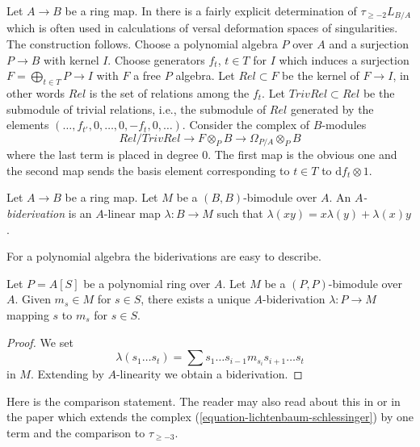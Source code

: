 \noindent
Let $A \to B$ be a ring map. In \cite{Lichtenbaum-Schlessinger}
there is a fairly explicit determination of $\tau_{\geq -2}L_{B/A}$
which is often used in calculations of versal deformation spaces of
singularities. The construction follows.
Choose a polynomial algebra $P$ over $A$
and a surjection $P \to B$ with kernel $I$. Choose generators
$f_t$, $t \in T$ for $I$ which induces a surjection
$F = \bigoplus_{t \in T} P \to I$ with $F$ a free $P$ algebra.
Let $Rel \subset F$ be the kernel of $F \to I$, in other words
$Rel$ is the set of relations among the $f_t$. Let $TrivRel \subset Rel$
be the submodule of trivial relations, i.e., the submodule of $Rel$
generated by the elements $(\ldots, f_{t'}, 0, \ldots, 0, -f_t, 0, \ldots)$.
Consider the complex of $B$-modules
\begin{equation}
\label{equation-lichtenbaum-schlessinger}
Rel/TrivRel \longrightarrow
F \otimes_P B \longrightarrow
\Omega_{P/A} \otimes_P B
\end{equation}
where the last term is placed in degree $0$. The first map is the obvious
one and the second map sends the basis element corresponding to $t \in T$
to $\text{d}f_t \otimes 1$.

\begin{definition}
\label{definition-biderivation}
Let $A \to B$ be a ring map. Let $M$ be a $(B, B)$-bimodule
over $A$. An {\it $A$-biderivation} is an $A$-linear map $\lambda : B \to M$
such that $\lambda(xy) = x\lambda(y) + \lambda(x)y$.
\end{definition}

\noindent
For a polynomial algebra the biderivations are easy to describe.

\begin{lemma}
\label{lemma-polynomial-ring-unique}
Let $P = A[S]$ be a polynomial ring over $A$. Let $M$ be a $(P, P)$-bimodule
over $A$. Given $m_s \in M$ for $s \in S$, there exists a unique
$A$-biderivation $\lambda : P \to M$ mapping $s$ to $m_s$ for $s \in S$.
\end{lemma}

\begin{proof}
We set
$$
\lambda(s_1 \ldots s_t) =
\sum s_1 \ldots s_{i - 1} m_{s_i} s_{i + 1} \ldots s_t
$$
in $M$. Extending by $A$-linearity we obtain a biderivation.
\end{proof}

\noindent
Here is the comparison statement. The reader may also read about this
in \cite[page 206, Proposition 12]{Andre-Homologie} or in the paper
\cite{Doncel} which extends the complex
(\ref{equation-lichtenbaum-schlessinger}) by one term and the comparison
to $\tau_{\geq -3}$.

